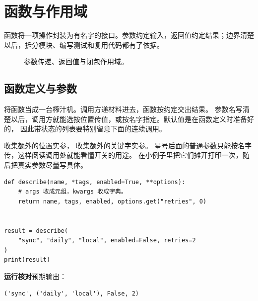 \chapter{函数与作用域}
\label{ch:04-outline}

函数将一项操作封装为有名字的接口。参数约定输入，返回值约定结果；边界清楚以后，拆分模块、编写测试和复用代码都有了依据。


\begin{figure}[htbp]
  \centering
  \caption*{参数传递、返回值与闭包作用域。}
\end{figure}


\section{函数定义与参数}

将函数当成一台榨汁机。调用方递材料进去，函数按约定交出结果。
参数名写清楚以后，调用方就能选按位置传值，或按名字指定。默认值是在函数定义时准备好的，
因此带状态的列表要特别留意下面的连续调用。

 收集额外的位置实参， 收集额外的关键字实参。
星号后面的普通参数只能按名字传，这样阅读调用处就能看懂开关的用途。
在小例子里把它们摊开打印一次，随后把真实参数尽量写具体。


\begin{lstlisting}[title={\code{call_options.py}}]
def describe(name, *tags, enabled=True, **options):
    # args 收成元组，kwargs 收成字典。
    return name, tags, enabled, options.get("retries", 0)


result = describe(
    "sync", "daily", "local", enabled=False, retries=2
)
print(result)
\end{lstlisting}


\textbf{运行核对}\enspace 预期输出：
\begin{lstlisting}[language={},numbers=none]
('sync', ('daily', 'local'), False, 2)
\end{lstlisting}

